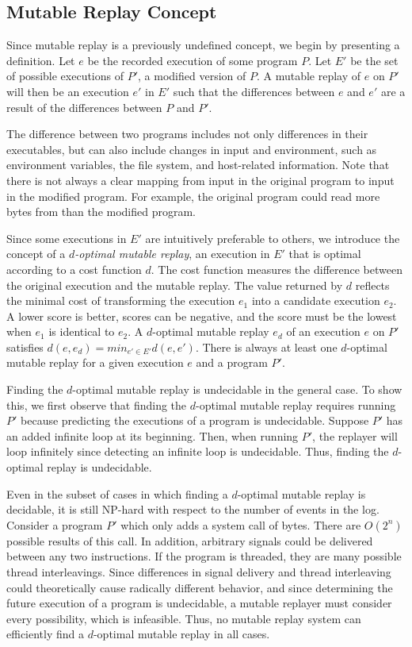 \subsection{Mutable Replay Concept}
\label{sec:definition}

Since mutable replay is a previously undefined concept, we begin by
presenting a definition.  Let $e$ be the recorded execution of some
program $P$. Let $E'$ be the set of possible executions of $P'$, a
modified version of $P$. A mutable replay of $e$ on $P'$ will then be
an execution $e'$ in $E'$ such that the differences between $e$ and
$e'$ are a result of the differences between $P$ and $P'$.

The difference between two programs includes not only differences in
their executables, but can also include changes in input and
environment, such as environment variables, the file system,
and host-related information.
Note that there is
not always a clear mapping from input in the original program to input
in the modified program. For example, the original program could read more bytes
from  than the modified program.

Since some executions in $E'$ are intuitively preferable to others, we introduce the
concept of a \emph{$d$-optimal mutable replay}, an execution in $E'$
that is optimal according to a cost function $d$.  The cost function
measures the difference between the original execution
and the mutable replay.  The value returned by $d$ reflects the minimal cost
of transforming the execution $e_1$ into a candidate execution
$e_2$. A lower score is better, scores can be negative, and the score
must be the lowest when $e_1$ is identical to $e_2$. A $d$-optimal
mutable replay $e_{d}$ of an execution $e$ on $P'$ satisfies $d(e, e_{d}) = min_{e' \in E'}
d(e, e')$. There is always at least one $d$-optimal mutable replay for
a given execution $e$ and a program $P'$.

Finding the $d$-optimal mutable replay is undecidable in the general
case. To show this, we first observe that finding the $d$-optimal mutable
replay requires running $P'$ because predicting the executions of a
program is undecidable. Suppose $P'$ has an added infinite loop at its
beginning. Then, when running $P'$, the replayer will loop infinitely
since detecting an infinite loop is undecidable. Thus, finding the $d$-optimal
replay is undecidable.

Even in the subset of cases in which finding a $d$-optimal mutable
replay is decidable, it is still NP-hard with respect to the number of events in
the log. Consider a program $P'$
which only adds a  system call of  bytes. There are
$O(2^{n})$ possible results of this call. In addition, arbitrary signals could be
delivered between any two instructions. If the program is threaded,
they are many possible thread interleavings. Since
differences in signal delivery and thread interleaving could
theoretically cause radically different behavior, and since determining the
future execution of a program is undecidable, a mutable replayer must
consider every possibility, which is infeasible. Thus, no mutable replay system
can efficiently find a $d$-optimal mutable replay in all cases.

